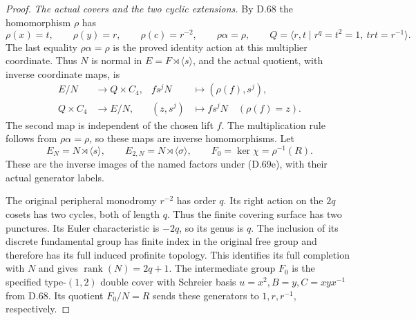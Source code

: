 \begin{proof}
\emph{The actual covers and the two cyclic extensions.}
By D.68 the homomorphism $\rho$ has
\[
 \rho(x)=t,\qquad \rho(y)=r,\qquad
 \rho(c)=r^{-2},\qquad
 \rho\alpha=\rho,\qquad
 Q=\langle r,t\mid r^q=t^2=1,\ trt=r^{-1}\rangle .
                                                               \tag{D.69d}
\]
The last equality $\rho\alpha=\rho$ is the proved identity
action at this multiplier coordinate. Thus $N$ is normal
in $E=F\rtimes\langle s\rangle$, and the actual quotient,
with inverse coordinate maps, is
\[
 \begin{aligned}
 E/N&\longrightarrow Q\times C_4,
        &fs^jN&\longmapsto(\rho(f),s^j),\\
 Q\times C_4&\longrightarrow E/N,
        &(z,s^j)&\longmapsto fs^jN\quad(\rho(f)=z).
 \end{aligned}                                               \tag{D.69e}
\]
The second map is independent of the chosen lift $f$.
The multiplication rule follows from $\rho\alpha=\rho$,
so these maps are inverse homomorphisms.
Let
\[
 E_N=N\rtimes\langle s\rangle,\qquad
 E_{2,N}=N\rtimes\langle\sigma\rangle,\qquad
 F_0=\ker\chi=\rho^{-1}(R).
                                                               \tag{D.69f}
\]
These are the inverse images of the named factors under
(D.69e), with their actual generator labels.

The original peripheral monodromy $r^{-2}$ has order $q$.
Its right action on the $2q$ cosets has two cycles, both
of length $q$. Thus the finite covering surface has two
punctures. Its Euler characteristic is $-2q$, so its
genus is $q$. The inclusion of its discrete fundamental
group has finite index in the original free group and
therefore has its full induced profinite topology.
This identifies its full completion with $N$ and gives
$\operatorname{rank}(N)=2q+1$.
The intermediate group $F_0$ is the specified type-$(1,2)$
double cover with Schreier basis $u=x^2,B=y,C=xyx^{-1}$
from D.68. Its quotient $F_0/N=R$ sends these generators
to $1,r,r^{-1}$, respectively.


\end{proof}
